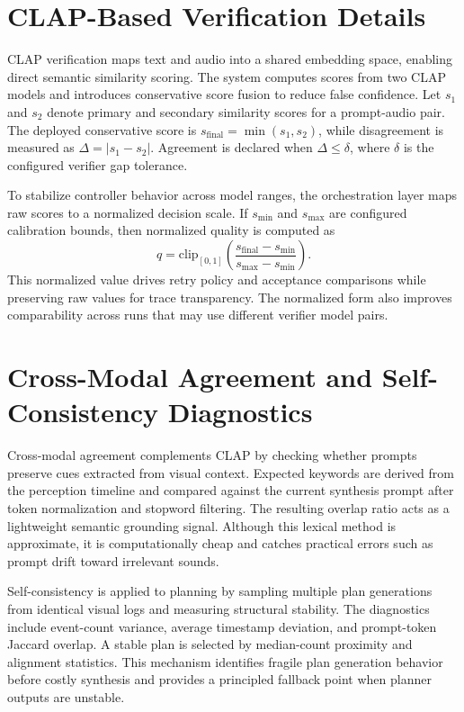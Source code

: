 \documentclass[12pt]{article}
\begin{document}
\section{CLAP-Based Verification Details}

CLAP verification maps text and audio into a shared embedding space, enabling direct semantic similarity scoring. The system computes scores from two CLAP models and introduces conservative score fusion to reduce false confidence. Let $s_1$ and $s_2$ denote primary and secondary similarity scores for a prompt-audio pair. The deployed conservative score is $s_{\text{final}} = \min(s_1, s_2)$, while disagreement is measured as $\Delta = |s_1 - s_2|$. Agreement is declared when $\Delta \leq \delta$, where $\delta$ is the configured verifier gap tolerance.

To stabilize controller behavior across model ranges, the orchestration layer maps raw scores to a normalized decision scale. If $s_{\min}$ and $s_{\max}$ are configured calibration bounds, then normalized quality is computed as
\[
q = \mathrm{clip}_{[0,1]}\left(\frac{s_{\text{final}} - s_{\min}}{s_{\max} - s_{\min}}\right).
\]
This normalized value drives retry policy and acceptance comparisons while preserving raw values for trace transparency. The normalized form also improves comparability across runs that may use different verifier model pairs.

\section{Cross-Modal Agreement and Self-Consistency Diagnostics}

Cross-modal agreement complements CLAP by checking whether prompts preserve cues extracted from visual context. Expected keywords are derived from the perception timeline and compared against the current synthesis prompt after token normalization and stopword filtering. The resulting overlap ratio acts as a lightweight semantic grounding signal. Although this lexical method is approximate, it is computationally cheap and catches practical errors such as prompt drift toward irrelevant sounds.

Self-consistency is applied to planning by sampling multiple plan generations from identical visual logs and measuring structural stability. The diagnostics include event-count variance, average timestamp deviation, and prompt-token Jaccard overlap. A stable plan is selected by median-count proximity and alignment statistics. This mechanism identifies fragile plan generation behavior before costly synthesis and provides a principled fallback point when planner outputs are unstable.
\end{document}
